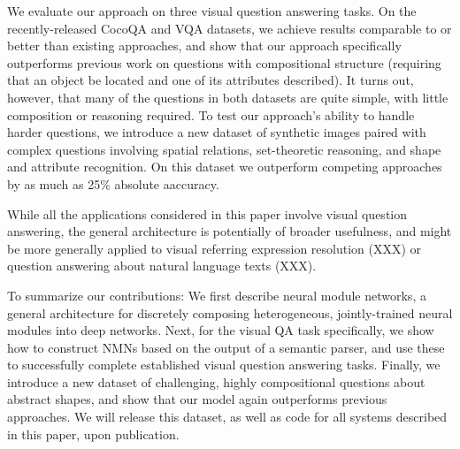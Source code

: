 




We evaluate our approach on three visual question answering tasks. On the
recently-released CocoQA \cite{yu15arxiv} and VQA \cite{antol15iccv} datasets,
we achieve results comparable to or better than existing approaches, and show
that our approach specifically outperforms previous work on questions with
compositional structure (\eg requiring that an object be located and one of its
attributes described). It turns out, however, that many of the questions in both
datasets are quite simple, with little composition or reasoning required. To
test our approach's ability to handle harder questions, we introduce
a new dataset of synthetic images paired with complex questions involving
spatial relations, set-theoretic reasoning, and shape and attribute recognition.
On this dataset we outperform competing approaches by as much as 25\% absolute
aaccuracy.

While all the applications considered in this paper involve visual question
answering, the general architecture is potentially of broader usefulness, and
might be more generally applied to visual referring expression resolution (XXX)
or question answering about natural language texts (XXX).


To summarize our contributions: We first describe neural module networks, a
general architecture for discretely composing heterogeneous, jointly-trained
neural modules into deep networks. Next, for the visual QA task specifically, we
show how to construct NMNs based on the output of a semantic parser, and use
these to successfully complete established visual question answering tasks.
Finally, we introduce a new dataset of challenging, highly compositional
questions about abstract shapes, and show that our model again outperforms
previous approaches. We will release this dataset, as well as code for all
systems described in this paper, upon publication.

